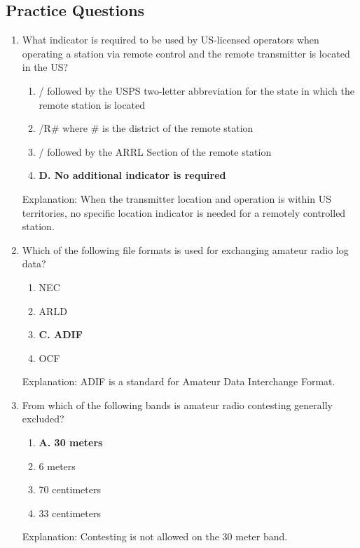 \subsection*{Practice Questions}
\begin{enumerate}
  \item What indicator is required to be used by US-licensed operators when operating a station via remote control and the remote transmitter is located in the US?
    \begin{enumerate}
        \item  / followed by the USPS two-letter abbreviation for the state in which the remote station is located
        \item  /R\# where \# is the district of the remote station
        \item  / followed by the ARRL Section of the remote station
        \item \textbf{D. No additional indicator is required}
    \end{enumerate}
     \textcolor{myred}{Explanation:}
     When the transmitter location and operation is within US territories, no specific location indicator is needed for a remotely controlled station.

  \item Which of the following file formats is used for exchanging amateur radio log data?
      \begin{enumerate}
      \item  NEC
        \item  ARLD
        \item \textbf{C. ADIF}
       \item  OCF
    \end{enumerate}
        \textcolor{myred}{Explanation:}
        ADIF is a standard for Amateur Data Interchange Format.
  
   \item From which of the following bands is amateur radio contesting generally excluded?
       \begin{enumerate}
       \item \textbf{A. 30 meters}
          \item  6 meters
        \item  70 centimeters
        \item  33 centimeters
    \end{enumerate}
      \textcolor{myred}{Explanation:}
    Contesting is not allowed on the 30 meter band.


\end{enumerate}
